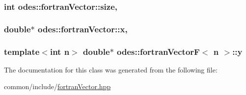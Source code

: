 \subsubsection[{size}]{\setlength{\rightskip}{0pt plus 5cm}int odes\+::fortran\+Vector\+::size\hspace{0.3cm}{\ttfamily [protected]}, {\ttfamily [inherited]}}\label{classodes_1_1fortranVector_a4734531bec0ccbaf24f22c12969580db}
\hypertarget{classodes_1_1fortranVector_aa92f26c38f887fca314d4e031b5ebe29}{}
\subsubsection[{x}]{\setlength{\rightskip}{0pt plus 5cm}double$\ast$ odes\+::fortran\+Vector\+::x\hspace{0.3cm}{\ttfamily [protected]}, {\ttfamily [inherited]}}\label{classodes_1_1fortranVector_aa92f26c38f887fca314d4e031b5ebe29}
\hypertarget{classodes_1_1fortranVectorF_ab63c07846aaec65436dddf3b8f55ae22}{}
\subsubsection[{y}]{\setlength{\rightskip}{0pt plus 5cm}template$<$int n$>$ double$\ast$ {\bf odes\+::fortran\+Vector\+F}$<$ n $>$\+::y\hspace{0.3cm}{\ttfamily [private]}}\label{classodes_1_1fortranVectorF_ab63c07846aaec65436dddf3b8f55ae22}


The documentation for this class was generated from the following file\+:\begin{DoxyCompactItemize}
\item 
common/include/\hyperlink{fortranVector_8hpp}{fortran\+Vector.\+hpp}\end{DoxyCompactItemize}

